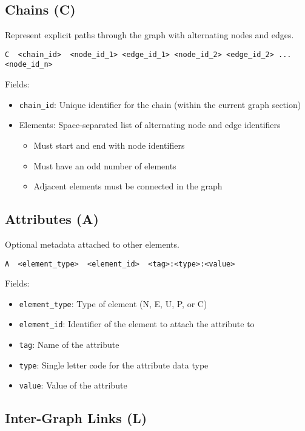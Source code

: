 \documentclass{article}
\begin{document}
\subsection{Chains (C)}

Represent explicit paths through the graph with alternating nodes and edges.

\begin{lstlisting}
C  <chain_id>  <node_id_1> <edge_id_1> <node_id_2> <edge_id_2> ... <node_id_n>
\end{lstlisting}

Fields:
\begin{itemize}
	\item \texttt{chain\_id}: Unique identifier for the chain (within the current graph section)
	\item Elements: Space-separated list of alternating node and edge identifiers
	      \begin{itemize}
		      \item Must start and end with node identifiers
		      \item Must have an odd number of elements
		      \item Adjacent elements must be connected in the graph
	      \end{itemize}
\end{itemize}

\subsection{Attributes (A)}

Optional metadata attached to other elements.

\begin{lstlisting}
A  <element_type>  <element_id>  <tag>:<type>:<value>
\end{lstlisting}

Fields:
\begin{itemize}
	\item \texttt{element\_type}: Type of element (N, E, U, P, or C)
	\item \texttt{element\_id}: Identifier of the element to attach the attribute to
	\item \texttt{tag}: Name of the attribute
	\item \texttt{type}: Single letter code for the attribute data type
	\item \texttt{value}: Value of the attribute
\end{itemize}

\subsection{Inter-Graph Links (L)}
\end{document}
